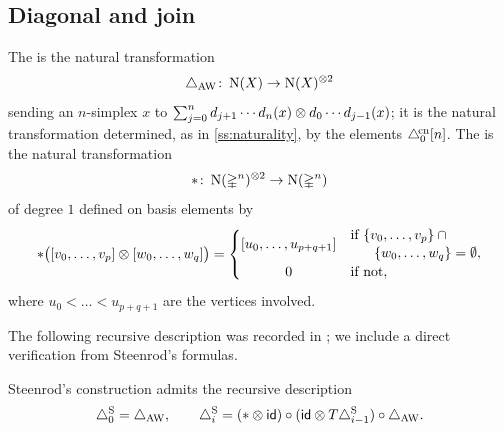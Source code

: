 
\subsection{Diagonal and join}\label{ss:join}

The  is the natural transformation
\[
\triangle_{{\mathrm{AW}}} \colon \operatorname{N}(X) \to \operatorname{N}(X)^{\otimes 2}
\]
sending an $n$-simplex $x$ to $\sum_{j=0}^{n} d_{j+1} \dotsm d_n(x) \otimes d_0 \dotsm d_{j-1}(x)$; it is the natural transformation determined, as in \cref{ss:naturality}, by the elements $\triangle^{\!\mathrm{cn}}_0[n]$.
The  is the natural transformation
\[
\ast \colon \operatorname{N}(\mathbb{\Delta}^n)^{\otimes 2} \to \operatorname{N}(\mathbb{\Delta}^n)
\]
of degree $1$ defined on basis elements by
\[
\ast \big([v_0, \dots, v_p] \ot [w_0, \dots, w_q]\big) =
\begin{cases}
	[u_0, \dots, u_{p+q+1}] &
	\begin{aligned}
		&\text{if } \set{v_0, \dots, v_p} \cap {}\\[-2pt]
		&\hspace{17pt}\set{w_0, \dots, w_q} = \emptyset,
	\end{aligned}\\
	\hfil 0 & \text{if not},
\end{cases}
\]
where $u_0 < \dots < u_{p+q+1}$ are the vertices involved.

The following recursive description was recorded in \cite{medina2023dennis}; we include a direct verification from Steenrod's formulas.

\begin{lemma}
	Steenrod's construction admits the recursive description
	\begin{equation}\label{eq:prop cup-i}
		\triangle^{\mathrm{S}}_0 = \triangle_{{\mathrm{AW}}},
		\qquad
		\triangle^{\mathrm{S}}_i = (\ast \otimes \mathsf{id}) \circ (\mathsf{id} \otimes T\triangle^{\mathrm{S}}_{i-1}) \circ \triangle_{{\mathrm{AW}}}.
	\end{equation}
\end{lemma}


